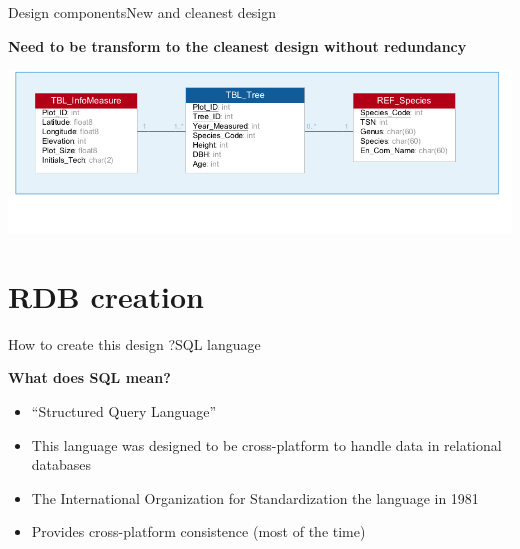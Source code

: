 \documentclass[table]{eecslides}
\begin{document}
\begin{frame}{Design components}{New and cleanest design}

\textbf{\alert{Need to be transform to the cleanest design without redundancy}}
\vspace{0.2cm}
	\begin{center}
		\includegraphics[width=0.8\paperwidth]{Ex1_pres_30Sept.png}
	\end{center}
\end{frame}

\section{RDB creation}

\begin{frame}{How to create this design ?}{SQL language}

\textbf{What does SQL mean?}
\begin{itemize}
	\item “Structured Query Language”
	\item This language was designed to be cross-platform to handle data in relational databases
	\item The International Organization for Standardization  the language in 1981
	\item Provides cross-platform consistence (most of the time)
\end{itemize}

\end{frame}

\end{document}
